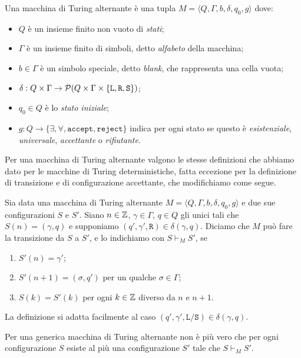 \begin{definizione}
\label{def:alt-TM}
 Una macchina di Turing alternante è una tupla
 $M=\langle Q, \Gamma, b, \delta, q_0, g \rangle$ dove:
 \begin{itemize}
  \item $Q$ è un insieme finito non vuoto di \emph{stati};
  \item $\Gamma$ è un insieme finito di simboli, detto \emph{alfabeto} della macchina;
  \item $b \in \Gamma$ è un simbolo speciale, detto \emph{blank}, che rappresenta
  una cella vuota;
  \item $\delta: Q \times \Gamma \to \mathcal{P}(Q \times \Gamma \times \{\texttt{L},\texttt{R},\texttt{S}\})$;
  \item $q_0 \in Q$ è lo \emph{stato iniziale};
  \item $g: Q \to \{\exists, \forall, \texttt{accept}, \texttt{reject}\}$
  indica per ogni stato se questo è \emph{esistenziale}, \emph{universale},
  \emph{accettante} o \emph{rifiutante}.
 \end{itemize}
\end{definizione}

Per una macchina di Turing alternante valgono le stesse definizioni che
abbiamo dato per le macchine di Turing deterministiche, 
fatta eccezione per la definizione di transizione e di configurazione accettante, che
modifichiamo come segue.
\begin{definizione}
 Sia data una macchina di Turing alternante $M=\langle Q, \Gamma, b, \delta, q_0, g \rangle$
 e due sue configurazioni $S$ e $S'$.
 Siano $n \in \mathbb{Z}$, $\gamma \in \Gamma$, $q \in Q$ gli unici tali che
 $S(n) = (\gamma, q)$ e supponiamo $(q', \gamma', \texttt{R}) \in \delta(\gamma, q)$.
 Diciamo che  $M$ può fare la transizione da $S$ a $S'$, e lo indichiamo con
 $S \vdash_M S'$, se 
 \begin{enumerate}
  \item $S'(n)=\gamma'$;
  \item $S'(n+1)=(\sigma, q')$ per un
 qualche $\sigma \in \Gamma$;
  \item $S(k) = S'(k)$ per ogni $k \in \mathbb{Z}$ diverso da
 $n$ e $n+1$.
 \end{enumerate}
 La definizione si adatta facilmente al caso
 $(q', \gamma', \texttt{L}/\texttt{S}) \in \delta(\gamma, q)$.
\end{definizione}

\begin{osservazione}
 Per una generica macchina di Turing alternante non è più vero che per ogni
 configurazione $S$ esiste al più una configurazione $S'$ tale che $S \vdash_M S'$.
\end{osservazione}

